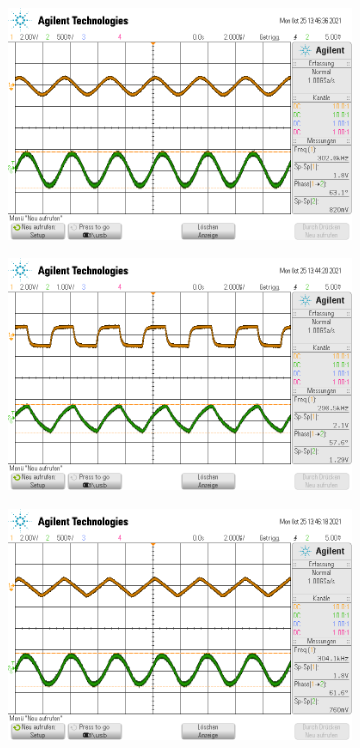\begin{figure}
  \centering
  \begin{subfigure}{0.35\textwidth}
    \centering
    \includegraphics[width=\textwidth]{ressources/integral_sinus.png}
  \end{subfigure}
  \begin{subfigure}{0.35\textwidth}
    \centering
    \includegraphics[width=\textwidth]{ressources/integral_rechteck.png}
  \end{subfigure}
  \begin{subfigure}{0.35\textwidth}
    \centering
    \includegraphics[width=\textwidth]{ressources/integral_dreieck.png}

\end{subfigure}
\end{figure}
